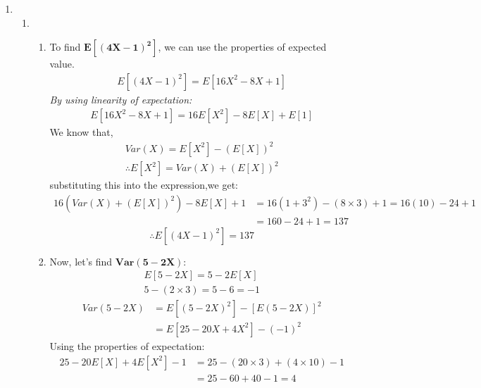 \documentclass{article}
\begin{document}
\begin{enumerate}
\begin{enumerate}
    \end{enumerate}

\newpage
\item
    \begin{enumerate}
    \item 
        \begin{enumerate}
        \item
            To find \(\mathbf{E[(4X - 1)^2]}\), we can use the properties of expected value.
            \begin{align*}
                E[(4X - 1)^2] = E[16X^2 - 8X + 1]
            \end{align*}
            \textit{By using linearity of expectation:}
            \begin{align*}
                E[16X^2 - 8X + 1] = 16E[X^2] - 8E[X] + E[1]
            \end{align*}
            We know that,
            \begin{align*}
                Var(X) = E[X^2] - (E[X])^2\\
                \therefore E[X^2] = Var(X) + (E[X])^2
            \end{align*}
            substituting this into the expression,we get:
            \begin{align*}
                16(Var(X) + (E[X])^2) - 8E[X] + 1 &= 16(1 + 3^2) - (8 \times 3) + 1 = 16(10) - 24 + 1\\
                &= 160 - 24 + 1 = 137
            \end{align*}
            \[
                \boxed{\therefore E\left[(4X - 1)^2\right] = 137}
            \]
        \item
            Now, let's find \(\mathbf{Var(5 - 2X)}\):
            \begin{align*}
                E[5 - 2X] = 5 - 2E[X]\\
                5 - (2 \times 3) = 5 - 6 = -1
            \end{align*}
            \begin{align*}
                Var(5 - 2X) &= E[(5 - 2X)^2] - [E(5 - 2X)]^2\\
                &= E[25 - 20X + 4X^2] - (-1)^2
            \end{align*}
            Using the properties of expectation:
            \begin{align*}
                25 - 20E[X] + 4E[X^2] - 1 &= 25 - (20 \times 3) + (4 \times 10) - 1
                \\ &= 25 - 60 + 40 - 1 = 4

\end{align*}
\end{enumerate}
\end{enumerate}
\end{enumerate}
\end{document}
